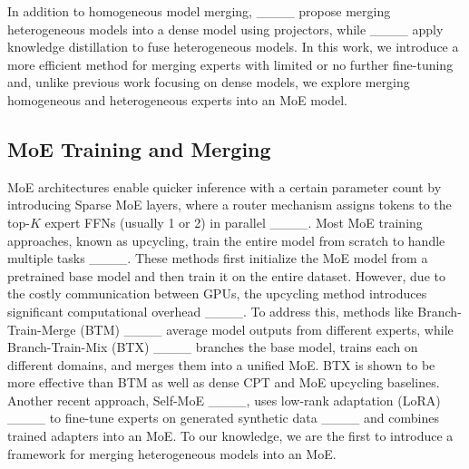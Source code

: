 In addition to homogeneous model merging, ____ propose merging heterogeneous models into a dense model using projectors, while ____ apply knowledge distillation to fuse heterogeneous models. 
In this work, we introduce a more efficient method for merging experts with limited or no further fine-tuning and, unlike previous work focusing on dense models, we explore merging homogeneous and heterogeneous experts into an MoE model. 

\subsection{MoE Training and Merging}


MoE architectures enable quicker inference with a certain parameter count by introducing Sparse MoE layers, where a router mechanism assigns tokens to the top-$K$ expert FFNs (usually 1 or 2) in parallel ____. Most MoE training approaches, known as upcycling, train the entire model from scratch to handle multiple tasks ____. These methods first initialize the MoE model from a pretrained base model and then train it on the entire dataset. However, due to the costly communication between GPUs, the upcycling method introduces significant computational overhead ____. To address this, methods like Branch-Train-Merge (BTM) ____ average model outputs from different experts, while Branch-Train-Mix (BTX) ____ branches the base model, trains each on different domains, and merges them into a unified MoE. 
BTX is shown to be more effective than BTM as well as dense CPT and MoE upcycling baselines.
Another recent approach, Self-MoE ____, uses low-rank adaptation (LoRA) ____ to fine-tune experts on generated synthetic data ____ and combines trained adapters into an MoE.
To our knowledge, we are the first to introduce a framework for merging heterogeneous models into an MoE.